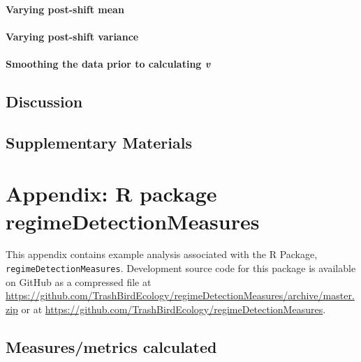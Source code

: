 \documentclass[12pt,twoside,openany]{reedthesis}
\begin{document}
\hypertarget{varying-post-shift-mean}{%
\subsubsection{Varying post-shift mean}\label{varying-post-shift-mean}}

\hypertarget{varying-post-shift-variance}{%
\subsubsection{Varying post-shift variance}\label{varying-post-shift-variance}}

\hypertarget{smoothing-the-data-prior-to-calculating-v}{%
\subsubsection{\texorpdfstring{Smoothing the data prior to calculating \emph{v}}{Smoothing the data prior to calculating v}}\label{smoothing-the-data-prior-to-calculating-v}}

\hypertarget{discussion-3}{%
\section{Discussion}\label{discussion-3}}

\hypertarget{supplementary-materials}{%
\section{Supplementary Materials}\label{supplementary-materials}}

\appendix

\hypertarget{regimeDetectionMeasures}{%
\chapter*{Appendix: R package regimeDetectionMeasures}\label{regimeDetectionMeasures}}

This appendix contains example analysis associated with the R Package, \texttt{regimeDetectionMeasures}. Development source code for this package is available on GitHub as a compressed file at \url{https://github.com/TrashBirdEcology/regimeDetectionMeasures/archive/master.zip} or at \url{https://github.com/TrashBirdEcology/regimeDetectionMeasures}.

\hypertarget{measuresmetrics-calculated}{%
\section{Measures/metrics calculated}\label{measuresmetrics-calculated}}
\end{document}
